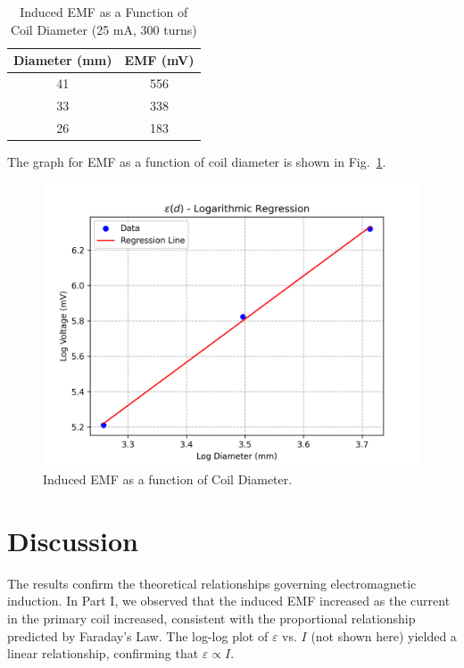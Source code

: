 \documentclass[journal]{IEEEtran}
\begin{document}
\begin{table}[H]
    \centering
    \caption{Induced EMF as a Function of Coil Diameter (25 mA, 300 turns)}
    \begin{tabular}{cc}
        \hline
        Diameter (mm) & EMF (mV) \\ \hline
        41 & 556 \\
        33 & 338 \\
        26 & 183 \\ \hline
    \end{tabular}
    \label{tab:emf_diameter}
\end{table}

The graph for EMF as a function of coil diameter is shown in Fig.~\ref{fig:epsilon_diameter}.

\begin{figure}[H]
    \centering
    \includegraphics[width=0.9\linewidth]{output_plots/epsilonD.png}
    \caption{Induced EMF as a function of Coil Diameter.}
    \label{fig:epsilon_diameter}
\end{figure}

\section{Discussion}
The results confirm the theoretical relationships governing electromagnetic induction. In Part I, we observed that the induced EMF increased as the current in the primary coil increased, consistent with the proportional relationship predicted by Faraday’s Law. The log-log plot of \(\varepsilon\) vs. \(I\) (not shown here) yielded a linear relationship, confirming that \(\varepsilon \propto I\).
\end{document}

